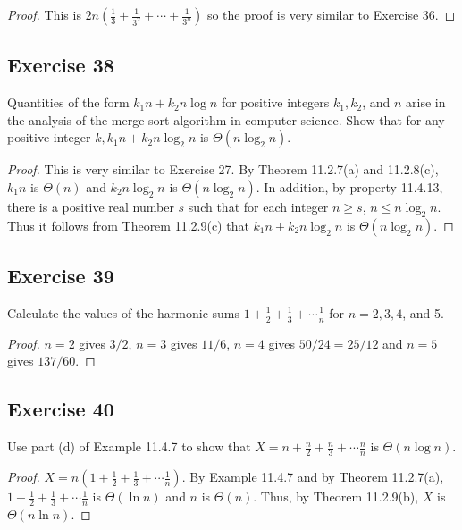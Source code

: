 \documentclass[14pt]{extarticle}
\newcommand{\dps}{\displaystyle}
\begin{document}
\begin{proof}
This is \(\dps 2n \left(\frac{1}{3} + \frac{1}{3^2} + \cdots + \frac{1}{3^n}\right)\) so the proof is very similar to 
Exercise 36.
\end{proof}

\subsection{Exercise 38}
Quantities of the form \(k_1n + k_2n \log n\) for positive integers \(k_1, k_2\), and \(n\) arise in the analysis of the 
merge sort algorithm in computer science. Show that for any positive integer \(k, k_1n + k_2n \log_2 n\) is 
\(\Theta(n \log_2 n)\).

\begin{proof}
This is very similar to Exercise 27. By Theorem 11.2.7(a) and 11.2.8(c), \(k_1n\) is \(\Theta(n)\) and \(k_2 n\log_2 n\) is 
\(\Theta(n\log_2 n)\). In addition, by property 11.4.13, there is a positive real number \(s\) such that for each integer 
\(n \geq s\), \(n \leq n\log_2 n\). Thus it follows from Theorem 11.2.9(c) that \(k_1n + k_2 n\log_2 n\) is
\(\Theta(n \log_2 n)\).
\end{proof}

\subsection{Exercise 39}
Calculate the values of the harmonic sums \(\dps 1 + \frac{1}{2} + \frac{1}{3} + \cdots \frac{1}{n}\) for \(n = 2, 3, 4\), 
and 5.

\begin{proof}
\(n = 2\) gives \(3/2\), \(n = 3\) gives \(11/6\), \(n = 4\) gives \(50/24 = 25/12\) and \(n = 5\) gives \(137/60\).
\end{proof}

\subsection{Exercise 40}
Use part (d) of Example 11.4.7 to show that \(\dps X = n + \frac{n}{2} + \frac{n}{3} + \cdots \frac{n}{n}\) is 
\(\Theta(n\log n)\).

\begin{proof}
\(\dps X = n\left(1 + \frac{1}{2} + \frac{1}{3} + \cdots \frac{1}{n}\right)\). By Example 11.4.7 and by Theorem 
11.2.7(a), \(1 + \frac{1}{2} + \frac{1}{3} + \cdots \frac{1}{n}\) is \(\Theta(\ln n)\) and \(n\) is \(\Theta(n)\).
Thus, by Theorem 11.2.9(b), \(X\) is \(\Theta(n \ln n)\).
\end{proof}
\end{document}
